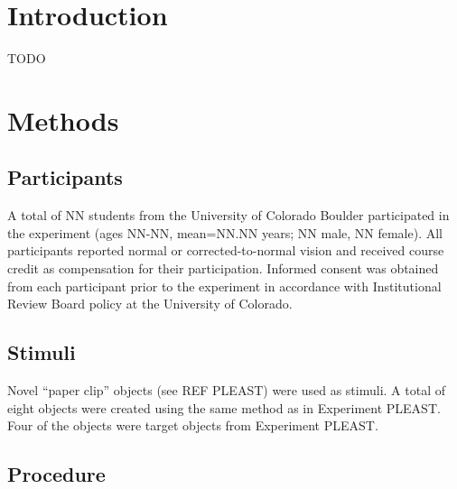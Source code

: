 \documentclass[../dwyatte_dissertation.tex]{subfiles}
\begin{document}
\section{Introduction}
TODO

\section{Methods}

\subsection{Participants}
A total of NN students from the University of Colorado Boulder participated in the experiment (ages NN-NN, mean=NN.NN years; NN male, NN female). All participants reported normal or corrected-to-normal vision and received course credit as	compensation for their participation. Informed consent was obtained from each participant prior to the experiment in accordance with Institutional Review Board policy at the University of Colorado.

\subsection{Stimuli}
Novel ``paper clip'' objects (see REF PLEAST) were used as stimuli. A total of eight objects were created using the same method as in Experiment PLEAST. Four of the objects were target objects from Experiment PLEAST.

\subsection{Procedure}



\end{document}
